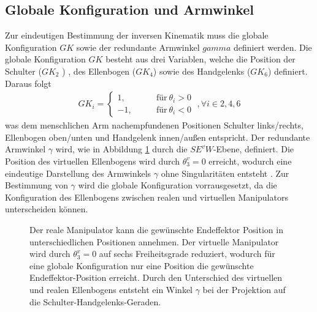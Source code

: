 \subsection{Globale Konfiguration und Armwinkel}
Zur eindeutigen Bestimmung der inversen Kinematik muss die globale Konfiguration $GK$ sowie der redundante Armwinkel $gamma$ definiert werden. Die globale Konfiguration $GK$ besteht aus drei Variablen, welche die Position der Schulter ($GK_2$ ) , des Ellenbogen ($GK_4$) sowie des Handgelenks ($GK_6$) definiert. Daraus folgt
\begin{align}
GK_i = \begin{cases}
1, \qquad &\text{für} \: \theta_i > 0\\
-1, \qquad &\text{für} \: \theta_i < 0
\end{cases}  \; ,\forall i \in {2,4,6}
\end{align}
was dem menschlichen Arm nachempfundenen Positionen Schulter links/rechts, Ellenbogen oben/unten und Handgelenk innen/außen entspricht. Der redundante Armwinkel $\gamma$ wird, wie in Abbildung \ref{fig:Elbow_redundancy} durch die $SE^vW$-Ebene, definiert. Die Position des virtuellen Ellenbogens wird durch $\theta_3^v=0$ erreicht, wodurch eine eindeutige Darstellung des Armwinkels $\gamma$ ohne Singularitäten entsteht \cite{Zhou}. Zur Bestimmung von $\gamma$ wird die globale Konfiguration vorrausgesetzt, da die Konfiguration des Ellenbogens zwischen realen und virtuellen Manipulators unterscheiden können. \\

\begin{figure}[h]
	\centering
	\caption{Der reale Manipulator kann die gewünschte Endeffektor Position in unterschiedlichen Positionen annehmen. Der virtuelle Manipulator wird durch $\theta_3^v=0$ auf sechs Freiheitsgrade reduziert, wodurch für eine globale Konfiguration nur eine Position die gewünschte Endeffektor-Position erreicht. Durch den Unterschied des virtuellen und realen Ellenbogens entsteht ein Winkel $\gamma$ bei der Projektion auf die Schulter-Handgelenks-Geraden.}
	\label{fig:Elbow_redundancy}
\end{figure}

